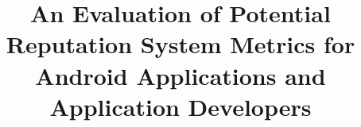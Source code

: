 \documentclass{acm_proc_article-sp}
\begin{document}
\title{An Evaluation of Potential Reputation System Metrics for Android Applications and Application Developers}
%
%
%
%
%
\end{document}
